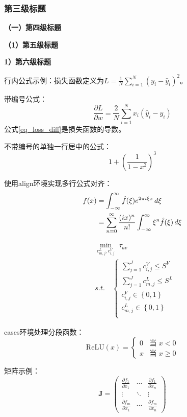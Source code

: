 \documentclass{JYU} %
\begin{document}
\subsubsection{第三级标题}

\textbf{（一）第四级标题}

\textbf{（1）第五级标题}

\textbf{1）第六级标题}

行内公式示例：损失函数定义为$L = \frac{1}{N}\sum_{i=1}^N(y_i-\hat{y}_i)^2$。

带编号公式：
\begin{equation}
	\frac{\partial L}{\partial w} = \frac{2}{N}\sum_{i=1}^N x_i(\hat{y}_i - y_i)
	\label{eq_loss_diff}
\end{equation}
公式\eqref{eq_loss_diff}是损失函数的导数。

不带编号的单独一行居中的公式：
\begin{equation*}
	1 + (\frac{1}{1-x^2})^3 
\end{equation*}

使用align环境实现多行公式对齐：
\begin{align}
	f(x) &= \int_{-\infty}^\infty \hat{f}(\xi)e^{2\pi i \xi x} \,d\xi \notag \\ 
	&= \sum_{n=0}^\infty \frac{(ix)^n}{n!}\int_{-\infty}^\infty \xi^n\hat{f}(\xi)\,d\xi 
	\label{eq_fourier}
\end{align}

\begin{equation*}
	\begin{split}
		&\min_{c_{m,j}^{L},c_{i,j}^{V}} \,\, \tau_{av} \\
		&s.t.\quad  
		\left\{\begin{array}{lc}
			\sum_{j=1}^{J}c_{i,j}^{V}\leq S^V    \\
			\sum_{j=1}^{J}c_{m,j}^{L}\leq S^L    \\
			c_{i,j}^{V}\in \left \{0,1\right \}  \\
			c_{m,j}^{L}\in \left \{0,1\right \}  \\
		\end{array}\right.
	\end{split}
\end{equation*}

cases环境处理分段函数：
\[
\text{ReLU}(x) = 
\begin{cases}
	0 & \text{当 } x < 0 \\
	x & \text{当 } x \geq 0
\end{cases}
\]

矩阵示例：
\[
\mathbf{J} = 
\begin{pmatrix}
	\frac{\partial f_1}{\partial x_1} & \cdots & \frac{\partial f_1}{\partial x_n} \\
	\vdots & \ddots & \vdots \\
	\frac{\partial f_m}{\partial x_1} & \cdots & \frac{\partial f_m}{\partial x_n}
\end{pmatrix}
\]
\end{document}
